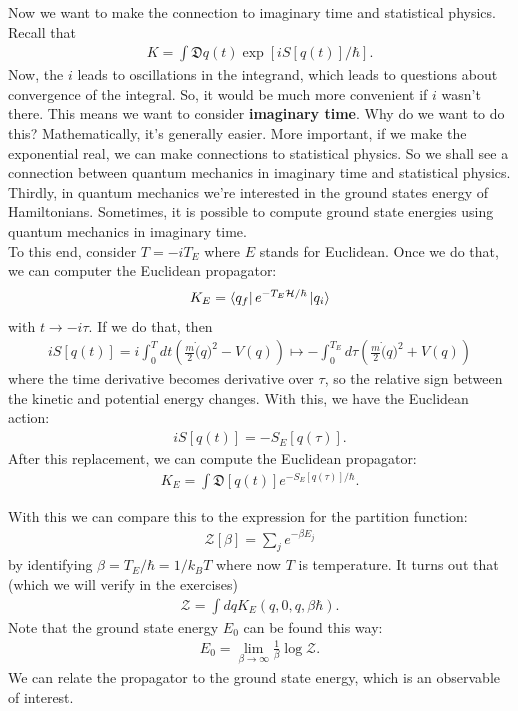 \documentclass{book}
\theoremstyle{definition}
\newcommand{\had}{\mathcal{H}}
\newcommand{\f}[2]{\frac{#1}{#2}}
\newcommand{\lp}{\left(}
\newcommand{\rp}{\right)}
\newcommand{\lb}{\left[}
\newcommand{\rb}{\right]}
\begin{document}
Now we want to make the connection to imaginary time and statistical physics. Recall that
\begin{align}
K = \int \mathfrak{D}q(t) \exp\lb iS[q(t)]/\hbar \rb.
\end{align}
Now, the $i$ leads to oscillations in the integrand, which leads to questions about convergence of the integral. So, it would be much more convenient if $i$ wasn't there. This means we want to consider \textbf{imaginary time}. Why do we want to do this? Mathematically, it's generally easier. More important, if we make the exponential real, we can make connections to statistical physics. So we shall see a connection between quantum mechanics in imaginary time and statistical physics. Thirdly, in quantum mechanics we're interested in the ground states energy of Hamiltonians. Sometimes, it is possible to compute ground state energies using quantum mechanics in imaginary time. \\


To this end, consider $T = -i T_E$ where $E$ stands for Euclidean. Once we do that, we can computer the Euclidean propagator:
\begin{align}
K_E = \bra{q_f}  e^{-T_E \had /\hbar} \ket{q_i}
\end{align}
with $t \to -i \tau$. If we do that, then 
\begin{align}
iS[q(t)] = i\int^T_0 dt \lp \f{m}{2}\dot(q)^2  - V(q)\rp \mapsto -\int^{T_E}_0 d\tau \lp \f{m}{2}\dot(q)^2 + V(q) \rp
\end{align}
where the time derivative becomes derivative over $\tau$, so the relative sign between the kinetic and potential energy changes. With this, we have the Euclidean action:
\begin{align}
iS[q(t)] = -S_E[q(\tau)].
\end{align}
After this replacement, we can compute the Euclidean propagator:
\begin{align}
K_E = \int \mathfrak{D}[q(t)] e^{-S_E[q(\tau)] /\hbar}.
\end{align}

With this we can compare this to the expression for the partition function:
\begin{align}
\mathcal{Z}[\beta] = \sum_j e^{-\beta E_j}
\end{align}
by identifying $\beta = T_E/\hbar = 1/k_BT$ where now $T$ is temperature. It turns out that (which we will verify in the exercises)
\begin{align}
\mathcal{Z} = \int dq K_E(q,0,q,\beta\hbar).
\end{align}
Note that the ground state energy $E_0$ can be found this way:
\begin{align}
E_0 = \lim_{\beta \to \infty} \f{1}{\beta} \log \mathcal{Z}.
\end{align}
We can relate the propagator to the ground state energy, which is an observable of interest. \\
\end{document}

